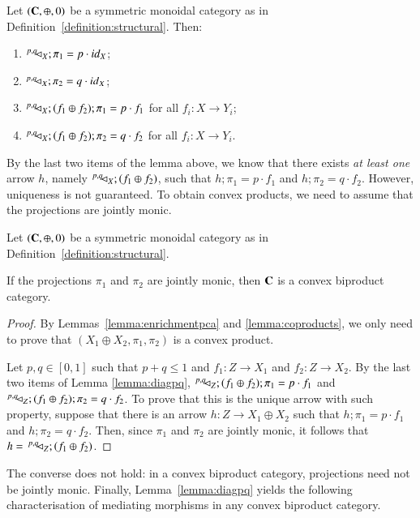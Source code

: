 \begin{lemma}\label{lemma:diagpq}
Let $(\mathbf{C}, \oplus, 0)$ be a symmetric monoidal category as in Definition~\ref{definition:structural}. %
Then: %
    \begin{enumerate}
        \item\label{lemma:diagpq1} $^{p,q\,}\!\! \lhd_{X};\pi_1 = p\cdot {id}_{X}$;
        \item\label{lemma:diagpq2} $^{p,q\,}\!\! \lhd_{X};\pi_2 = q\cdot {id}_{X}$;
       \item\label{lemma:diagpq4} $^{p,q\,}\!\! \lhd_{X};(f_1\oplus f_2); \pi_1= p\cdot f_1$ for all $f_i\colon X \to Y_i$;
       \item\label{lemma:diagpq5} $^{p,q\,}\!\! \lhd_{X};(f_1\oplus f_2); \pi_2= q\cdot f_2$ for all $f_i\colon X \to Y_i$.
    \end{enumerate}
\end{lemma}

By the last two items of the lemma above, we know that there exists \emph{at least one} arrow $h$, namely $^{p,q\,}\!\! \lhd_{X};(f_1\oplus f_2)$, such that $h;\pi_1=p\cdot f_1$ and $h;\pi_2=q\cdot f_2$. However, uniqueness is not guaranteed. To obtain convex products, we need to assume that the projections are jointly monic.

\begin{proposition}\label{prop:A}
Let $(\mathbf{C},\oplus,0)$ be a symmetric monoidal category as in Definition~\ref{definition:structural}. 
\begin{center}If the projections $\pi_1$ and $\pi_2$ are jointly monic, then $\mathbf{C}$ is a convex biproduct category.\end{center}
\end{proposition}
\begin{proof}
By Lemmas~\ref{lemma:enrichmentpca} and \ref{lemma:coproducts}, we only need to prove that $(X_1\oplus X_2, \pi_1,\pi_2)$ is a convex product. 

Let $p,q\in [0,1]$ such that $p+q\le 1$ and $f_1\colon Z\to X_1$ and $f_2\colon Z\to X_2$.
By the last two items of Lemma \ref{lemma:diagpq}, $^{p,q\,}\!\! \lhd_{Z};(f_1\oplus f_2); \pi_1= p\cdot f_1$ and $^{p,q\,}\!\! \lhd_{Z};(f_1\oplus f_2); \pi_2= q\cdot f_2$. To prove that this is the unique arrow with such property, suppose that there is an arrow $h\colon Z \to X_1\oplus X_2$ such that $h;\pi_1 = p\cdot f_1$ and $h;\pi_2 = q\cdot f_2$. Then, since $\pi_1$ and $\pi_2$ are jointly monic, it follows that $h =\, ^{p,q\,}\!\! \lhd_{Z};(f_1\oplus f_2)$.
\end{proof}
The converse does not hold: in a convex biproduct category, projections need not be jointly monic.
Finally, Lemma~\ref{lemma:diagpq} yields the following characterisation of mediating morphisms in any convex biproduct category.


